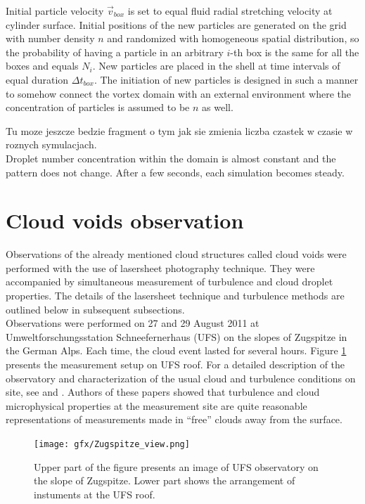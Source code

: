 \documentclass[../main.tex]{subfiles}
\begin{document}
Initial particle velocity $\vec{v}_{box}$ is set to equal fluid radial stretching velocity at cylinder surface. Initial positions of the new particles are generated on the grid with number density $n$ and randomized with homogeneous spatial distribution, so the probability of having a particle in an arbitrary $i$-th box is the same for all the boxes and equals $N_i$. New particles are placed in the shell at time intervals of equal duration $\Delta t_{box}$. The initiation of new particles is designed in such a manner to somehow connect the vortex domain with an external environment where the concentration of particles is assumed to be $n$ as well.

Tu moze jeszcze bedzie fragment o tym jak sie zmienia liczba czastek w czasie w roznych symulacjach.\\

 Droplet number concentration within the domain is almost constant and the pattern does not change. After a few seconds, each simulation becomes steady.

\section{Cloud voids observation}
\label{ch2s4}

Observations of the already mentioned cloud structures called cloud voids were performed with the use of lasersheet photography technique. They were accompanied by simultaneous measurement of turbulence and cloud droplet properties. The details of the lasersheet technique and turbulence methods are outlined below in subsequent subsections.\\
Observations were performed on 27 and 29 August 2011 at
Umweltforschungsstation Schneefernerhaus (UFS) on the
slopes of Zugspitze in the German Alps. Each time, the cloud event lasted for several hours. Figure \ref{fig:ch2_06} presents the measurement setup on UFS roof. For a detailed description of the observatory and characterization of the usual cloud and turbulence conditions on site, see \citet{Risius2015} and \citet{Siebert2015}. Authors of these papers showed that turbulence and cloud microphysical properties at the measurement site are quite reasonable representations of measurements made in “free” clouds away from the surface.\\
\begin{figure}
\centering
\noindent \texttt{[image: gfx/Zugspitze\_view.png]}
\caption{Upper part of the figure presents an image of UFS observatory on the slope of Zugspitze. Lower part shows the arrangement of instuments at the UFS roof.}
\label{fig:ch2_06}
\end{figure}
\end{document}
